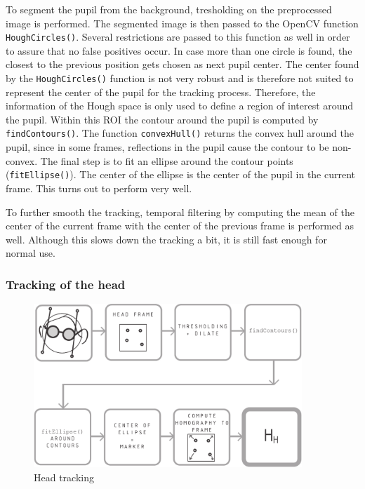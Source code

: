 To segment the pupil from the background, tresholding on the preprocessed image is performed. 
The segmented image is then passed to the OpenCV function \texttt{HoughCircles()}. 
Several restrictions are passed to this function as well in order to assure that no false positives occur. 
In case more than one circle is found, the closest to the previous position gets chosen as next pupil center.
The center found by the \texttt{HoughCircles()} function is not very robust and is therefore not suited to represent the center of the pupil for the tracking process.
Therefore, the information of the Hough space is only used to define a region of interest around the pupil. 
Within this ROI the contour around the pupil is computed by \texttt{findContours()}. 
The function \texttt{convexHull()} returns the convex hull around the pupil, since in some frames, reflections in the pupil cause the contour to be non-convex.
The final step is to fit an ellipse around the contour points (\texttt{fitEllipse()}).
The center of the ellipse is the center of the pupil in the current frame. 
This turns out to perform very well. 

To further smooth the tracking, temporal filtering by computing the mean of the center of the current frame with the center of the previous frame is performed as well. 
Although this slows down the tracking a bit, it is still fast enough for normal use.

\subsubsection{Tracking of the head}
\begin{figure}[H]
  \centering
  \includegraphics[width=0.9\textwidth]{../finalpres/03c.pdf}
  \caption{Head tracking}\label{fig:head}
\end{figure}

